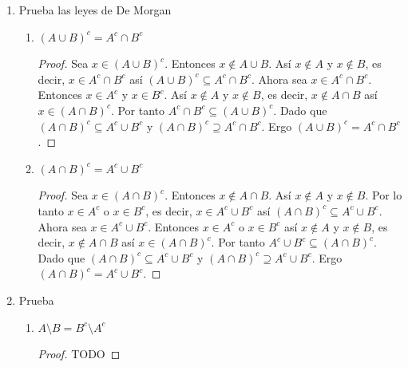 \documentclass[11pt,letterpaper]{report}
\begin{document}
\begin{enumerate}
\begin{enumerate}[label=\alph*)]
\begin{proof}
        Por demostrar que $A \setminus (B \cap C) \subset (A \subseteq B) \cup (A \setminus C)$.
        Sea $x \in A \setminus (B \cap C)$. Entonces $x \in A$ y $x \notin (B \cap C)$.
        Por tanto $x \in A$, y $x \notin B$ o $x \notin C$. Sin perdida de generalidad, asumimos
        que $x \notin B$. Entonces se tiene que $x \in A$ y $x \notin B$ y así $x \in A \setminus B$.
        Por tanto $x \in (A \setminus B) \cup (A \setminus C)$.

        Ergo $(A \setminus B) \cup (A \setminus C) = A \setminus (B \cap C)$.

    \end{proof}

\end{enumerate}

\item Prueba las leyes de De Morgan
\begin{enumerate}
    \item $(A \cup B)^c = A^c \cap B^c$
    \begin{proof}
        Sea $x \in (A \cup B)^c$. Entonces $x \notin A \cup B$. Así $x \notin A$ y $x \notin B$, es
        decir, $x \in A^c \cap B^c$ así $(A \cup B)^c \subseteq A^c \cap B^c$. Ahora sea
        $x \in A^c \cap B^c$. Entonces $x \in A^c$ y $x \in B^c$. Así $x \notin A$ y $x \notin B$,
        es decir, $x \notin A \cap B$ así $x \in (A \cap B)^c$. Por tanto $A^c \cap B^c \subseteq (A \cup B)^c$.
        Dado que $(A \cap B)^c \subseteq A^c \cup B^c$ y $(A \cap B)^c \supseteq A^c \cap B^c$.
        Ergo $(A \cup B)^c = A^c \cap B^c$.
    \end{proof}

    \item $(A \cap B)^c = A^c \cup B^c$
    \begin{proof}
        Sea $x \in (A \cap B)^c$. Entonces $x \notin A \cap B$. Así $x \notin A$ y $x \notin B$. 
        Por lo tanto $x \in A^c$ o $x \in B^c$, es
        decir, $x \in A^c \cup B^c$ así $(A \cap B)^c \subseteq A^c \cup B^c$. Ahora sea
        $x \in A^c \cup B^c$. Entonces $x \in A^c$ o $x \in B^c$ así $x \notin A$ y $x \notin B$,
        es decir, $x \notin A \cap B$ así $x \in (A \cap B)^c$. Por tanto $A^c \cup B^c \subseteq (A \cap B)^c$.
        Dado que $(A \cap B)^c \subseteq A^c \cup B^c$ y $(A \cap B)^c \supseteq A^c \cup B^c$.
        Ergo $(A \cap B)^c = A^c \cup B^c$.
    \end{proof}
\end{enumerate}

\item Prueba
\begin{enumerate}
    \item $A \setminus B = B^c \setminus A^c$
    \begin{proof}
        TODO
    \end{proof}


\end{enumerate}
\end{enumerate}
\end{document}
